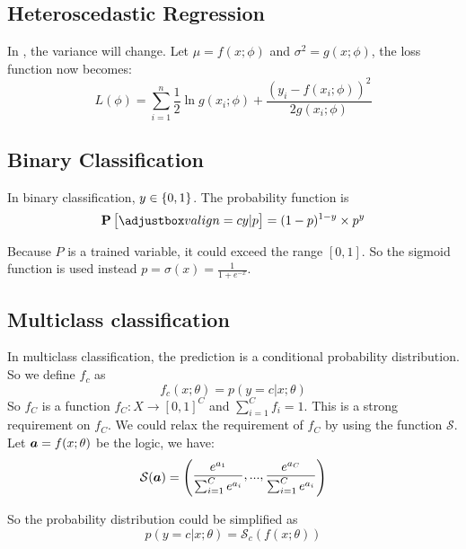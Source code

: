 \subsection{Heteroscedastic Regression}

In , the variance will change. Let $\mu = f(x;\phi)$ and $\sigma^2 = g(x;\phi)$, the loss function now becomes:
\begin{equation}
    L(\phi) = \sum_{i=1}^n \frac{1}{2} \ln g(x_i;\phi) + \frac{\left(y_i - f(x_i;\phi)\right)^2}{2 g(x_i;\phi)}
\end{equation}

\subsection{Binary Classification}

In binary classification, $y \in \set{0,1}$. The probability function is
\begin{equation}
    \probability{y|p} = (1-p)^{1-y} \times p^y
\end{equation}

Because $P$ is a trained variable, it could exceed the range $[0, 1]$. So the sigmoid function is used instead $p = \sigma(x) = \frac{1}{1+e^{-x}}$.

\subsection{Multiclass classification}

In multiclass classification, the prediction is a conditional probability distribution. So we define $f_c$ as
    \begin{equation}
        f_c(x;\theta) = p(y=c|x;\theta)
    \end{equation}
    So $f_C$ is a function $f_C: X \rightarrow [0,1]^C$ and $\displaystyle \sum_{i=1}^C f_i = 1$. This is a strong requirement on $f_C$. We could relax the requirement of $f_C$ by using the  function $\mathcal{S}$. Let $\boldsymbol{a} = f(x;\theta)$ be the logic, we have:
    \begin{equation}
        \mathcal{S}(\boldsymbol{a}) = \begin{pmatrix}\displaystyle
            \frac{e^{a_1}}{\sum_{i=1}^C e^{a_i}}, ..., \frac{e^{a_C}}{\sum_{i=1}^C e^{a_i}}
        \end{pmatrix}
    \end{equation}
    
    So the probability distribution could be simplified as
    \begin{equation}
        p(y=c|x;\theta) = \mathcal{S}_c \left(f(x;\theta)\right)
    \end{equation}
    
